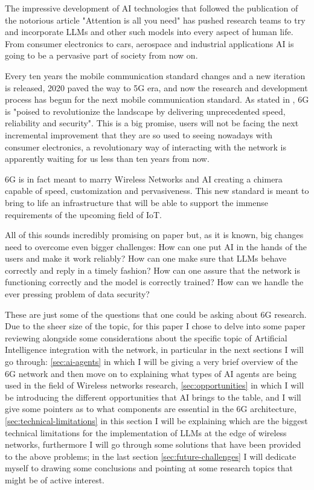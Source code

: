 

The impressive development of AI technologies that followed the publication of the notorious article
"Attention is all you need"\cite{attention} has pushed research teams to try and incorporate LLMs
and other such models into every aspect of human life. From consumer electronics to cars, aerospace
and industrial applications AI is going to be a pervasive part of society from now on.

Every ten years the mobile communication standard changes and a new iteration is released, 2020
paved the way to 5G era, and now the research and development process has begun for the next mobile
communication standard. As stated in \cite{6ainets}, 6G is "poised to revolutionize the landscape by
delivering unprecedented speed, reliability and security". This is a big promise, users will not be
facing the next incremental improvement that they are so used to seeing nowadays with consumer
electronics, a revolutionary way of interacting with the network is apparently waiting for us less
than ten years from now.

6G is in fact meant to marry Wireless Networks and AI creating a chimera capable of speed,
customization and pervasiveness. This new standard is meant to bring to life an infrastructure that
will be able to support the immense requirements of the upcoming field of IoT.

\bigskip

All of this sounds incredibly promising on paper but, as it is known, big changes need to overcome even
bigger challenges: How can one put AI in the hands of the users and make it work reliably? How can
one make sure that LLMs behave correctly and reply in a timely fashion? How can one
assure that the network is functioning correctly and the model is correctly trained? How can we
handle the ever pressing problem of data security?

These are just some of the questions that one could be asking about 6G research. Due to the sheer size of the topic, for this
paper I chose to delve into some paper reviewing alongside some considerations about the specific
topic of Artificial Intelligence integration with the network, in particular in the next sections I
will go through: \ref{sec:ai-agents} in which I will be giving a very brief
overview of the 6G network and then move on to explaining what types
of AI agents are being used in the field of Wireless networks research, \ref{sec:opportunities} in
which I will be introducing the different opportunities that AI brings to the table, and I will
give some pointers as to what components are essential in the 6G architecture, \ref{sec:technical-limitations} in this section I will be explaining which are the biggest technical limitations for the implementation of LLMs at the edge of wireless networks, furthermore I will go through some solutions that have been provided to the above problems; in the last section \ref{sec:future-challenges} I will dedicate myself to drawing some
conclusions and pointing at some research topics that might be of active interest.
